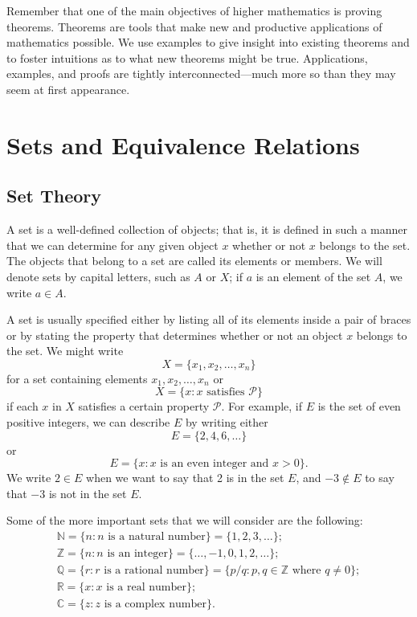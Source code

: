 Remember that one of the main objectives of higher mathematics is proving theorems. Theorems are tools that make new and productive applications of mathematics possible.  We use examples to give insight  into existing theorems and to foster intuitions as to what new theorems might be true.  Applications, examples, and proofs are tightly interconnected---much more so than they may seem at first appearance.
 
 
\section{Sets and Equivalence Relations}\label{sets_section_2}
 
 
\subsection*{Set Theory}
 
A {\bfi set\/} is a well-defined collection of objects; that is, it is defined in such a manner that we can determine for any given object $x$ whether or not $x$ belongs to the set.  The objects that belong to a set are called its {\bfi elements} or {\bfi members}. We will denote sets by capital letters, such as $A$ or $X$; if $a$ is an element of the set $A$, we write $a \in A$\label{setmembership}.

A set is usually specified either by listing all of its elements inside a pair of braces or by stating the property that determines whether or not an object $x$ belongs to the set. We might write
$$
X = \{ x_1, x_2, \ldots, x_n \}
$$
for a set containing elements $x_1, x_2, \ldots, x_n$ or
$$
X = \{ x :x \mbox{ satisfies ${\mathcal P}$}\}
$$
if each $x$ in $X$ satisfies a certain property ${\mathcal P}$.  For example, if $E$ is the set of even positive integers, we can describe $E$ by writing either 
$$
E = \{2, 4, 6, \ldots \}
$$
or
$$
E = \{ x : x \mbox{ is an even integer and $x > 0$} \}.
$$
We write $2 \in E$ when we want to say that 2 is in the set $E$, and $-3 \notin E$ to say that $-3$ is not in the set $E$.

Some of the more important sets that we will consider are the following: 
\begin{gather*}
{\mathbb N}\label{naturalnum}  = \{n: n \mbox{ is a natural number}\}  = \{1, 2, 3, \ldots \}; \\
{\mathbb Z}\label{integers}  = \{n : n \mbox{ is an integer} \} = \{\ldots, -1, 0, 1,  2, \ldots \} ; \\
{\mathbb Q}\label{rationals} = \{r : r \mbox{ is a rational number}\} = \{p/q : p, q \in {\mathbb Z} \mbox{ where $q \neq 0$}\}; \\
{\mathbb R}\label{reals} = \{ x : x \mbox{ is a real number} \}; \\
{\mathbb C}\label{complexnum} = \{z : z \mbox{ is a complex number}\}.
\end{gather*}

